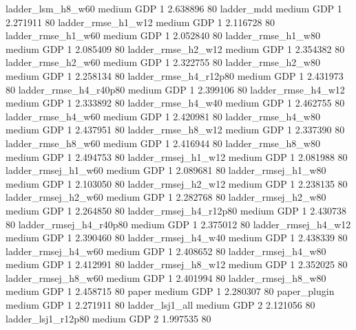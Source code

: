      ladder_lsm_h8_w60     medium      GDP                 1 2.638896 80
            ladder_mdd     medium      GDP                 1 2.271911 80
    ladder_rmse_h1_w12     medium      GDP                 1 2.116728 80
    ladder_rmse_h1_w60     medium      GDP                 1 2.052840 80
    ladder_rmse_h1_w80     medium      GDP                 1 2.085409 80
    ladder_rmse_h2_w12     medium      GDP                 1 2.354382 80
    ladder_rmse_h2_w60     medium      GDP                 1 2.322755 80
    ladder_rmse_h2_w80     medium      GDP                 1 2.258134 80
 ladder_rmse_h4_r12p80     medium      GDP                 1 2.431973 80
 ladder_rmse_h4_r40p80     medium      GDP                 1 2.399106 80
    ladder_rmse_h4_w12     medium      GDP                 1 2.333892 80
    ladder_rmse_h4_w40     medium      GDP                 1 2.462755 80
    ladder_rmse_h4_w60     medium      GDP                 1 2.420981 80
    ladder_rmse_h4_w80     medium      GDP                 1 2.437951 80
    ladder_rmse_h8_w12     medium      GDP                 1 2.337390 80
    ladder_rmse_h8_w60     medium      GDP                 1 2.416944 80
    ladder_rmse_h8_w80     medium      GDP                 1 2.494753 80
   ladder_rmsej_h1_w12     medium      GDP                 1 2.081988 80
   ladder_rmsej_h1_w60     medium      GDP                 1 2.089681 80
   ladder_rmsej_h1_w80     medium      GDP                 1 2.103050 80
   ladder_rmsej_h2_w12     medium      GDP                 1 2.238135 80
   ladder_rmsej_h2_w60     medium      GDP                 1 2.282768 80
   ladder_rmsej_h2_w80     medium      GDP                 1 2.264850 80
ladder_rmsej_h4_r12p80     medium      GDP                 1 2.430738 80
ladder_rmsej_h4_r40p80     medium      GDP                 1 2.375012 80
   ladder_rmsej_h4_w12     medium      GDP                 1 2.390460 80
   ladder_rmsej_h4_w40     medium      GDP                 1 2.438339 80
   ladder_rmsej_h4_w60     medium      GDP                 1 2.408652 80
   ladder_rmsej_h4_w80     medium      GDP                 1 2.412991 80
   ladder_rmsej_h8_w12     medium      GDP                 1 2.352025 80
   ladder_rmsej_h8_w60     medium      GDP                 1 2.401994 80
   ladder_rmsej_h8_w80     medium      GDP                 1 2.458715 80
                 paper     medium      GDP                 1 2.280307 80
          paper_plugin     medium      GDP                 1 2.271911 80
       ladder_lsj1_all     medium      GDP                 2 2.121056 80
    ladder_lsj1_r12p80     medium      GDP                 2 1.997535 80
